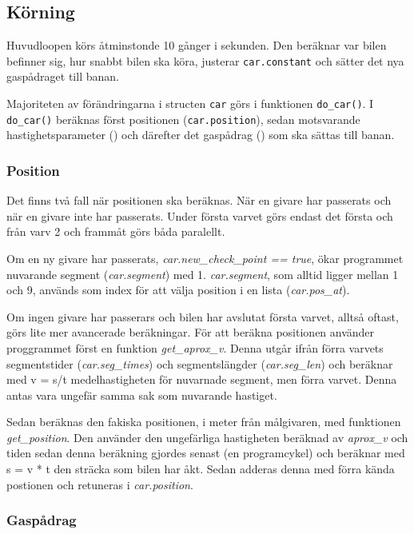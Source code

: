 \subsection{Körning}

Huvudloopen körs åtminstonde 10 gånger i sekunden. Den beräknar var bilen
befinner sig, hur snabbt bilen ska köra, justerar \texttt{car.constant} och sätter det
nya gaspådraget till banan.

Majoriteten av förändringarna i structen \texttt{car} görs i funktionen \texttt{do\_car()}. 
I \texttt{do\_car()} beräknas  först positionen (\texttt{car.position}), 
sedan motsvarande hastighetsparameter () och därefter det gaspådrag 
() som ska sättas till banan.

\subsubsection{Position}

Det finns två fall när positionen ska beräknas. När en givare har passerats och
när en givare inte har passerats. Under första varvet görs endast det första och
från varv 2 och frammåt görs båda paralellt. 

Om en ny givare har passerats, \emph{car.new\_check\_point == true}, ökar
programmet nuvarande segment (\emph{car.segment}) med 1. \emph{car.segment}, som
alltid ligger mellan 1 och 9, används som index för att välja position i en
lista (\emph{car.pos\_at}). 

Om ingen givare har passerars och bilen har avslutat första varvet, alltså
oftast, görs lite mer avancerade beräkningar. För att beräkna positionen
använder proggrammet först en funktion \emph{get\_aprox\_v}. Denna utgår ifrån
förra varvets segmentstider (\emph{car.seg\_times}) och segmentslängder
(\emph{car.seg\_len}) och beräknar med v = s/t medelhastigheten för nuvarnade
segment, men förra varvet. Denna antas vara ungefär samma sak som nuvarande
hastiget. 

Sedan beräknas den fakiska positionen, i meter från målgivaren, med funktionen
\emph{get\_position}. Den använder den ungefärliga hastigheten beräknad av
\emph{aprox\_v} och tiden sedan denna beräkning gjordes senast (en programcykel)
och beräknar med s = v * t den sträcka som bilen har åkt. Sedan adderas denna
med förra kända postionen och retuneras i \emph{car.position}. 

\subsubsection{Gaspådrag}

